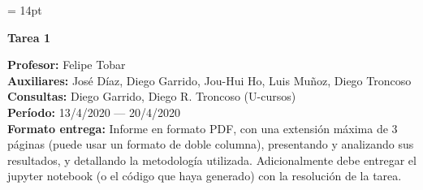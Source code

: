 \documentclass[11pt,letterpaper]{article}
\begin{document}
\pagestyle{fancy}
\fancyhf{}

\headheight = 14pt
\begin{center}
\large{\textbf{Tarea 1}}
\end{center}
\textbf{Profesor:} Felipe Tobar\\
\textbf{Auxiliares:} José Díaz, Diego Garrido, Jou-Hui Ho, Luis Muñoz, Diego Troncoso \\
\textbf{Consultas:} Diego Garrido,  Diego R. Troncoso  (U-cursos)\\
\textbf{Período:} 13/4/2020 --- 20/4/2020 \\

\noindent\textbf{Formato entrega:} Informe en formato PDF, con una extensión máxima de 3 páginas (puede usar un formato de doble columna), presentando y analizando sus resultados, y detallando la metodología utilizada. Adicionalmente debe entregar el jupyter notebook (o el código que haya generado) con la resolución de la tarea.

\vspace{5mm}
\end{document}
